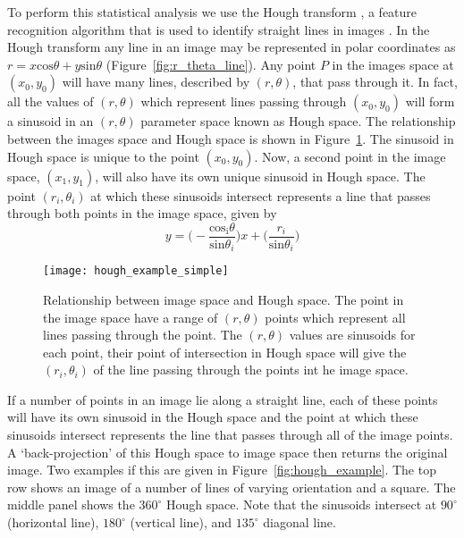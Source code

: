 To perform this statistical analysis we use the Hough transform \citep{hough1961}, a feature recognition algorithm that is used to identify straight lines in images \citep{duda1972}. In the Hough transform any line in an image may be represented in polar coordinates as $r=x\mathrm{cos}\theta +y\mathrm{sin}\theta$ (Figure~\ref{fig:r_theta_line}). Any point $P$ in the images space at $(x_0, y_0)$ will have many lines, described by $(r,\theta)$, that pass through it. In fact, all the values of $(r, \theta)$ which represent lines passing through $(x_0, y_0)$ will form a sinusoid in an $(r,\theta)$ parameter space known as Hough space. The relationship between the images space and Hough space is shown in Figure~\ref{fig:image_hough}. The sinusoid in Hough space is unique to the point $(x_0, y_0)$. Now, a second point in the image space, $(x_1, y_1)$, will also have its own unique sinusoid in Hough space. The point $(r_i,\theta_i)$ at which these sinusoids intersect represents a line that passes through both points in the image space, given by
\begin{equation}
y = \bigg(- \frac{\mathrm{cos_i}\theta}{\mathrm{sin}\theta_i}\bigg)x + \bigg(\frac{r_i}{\mathrm{sin}\theta_i}\bigg)
\end{equation}
\begin{figure}[t!]
\begin{center}
\texttt{[image: hough\_example\_simple]}
\caption[Relationship between image space and Hough space]{Relationship between image space and Hough space. The point in the image space have a range of $(r, \theta)$ points which represent all lines passing through the point. The $(r,\theta)$ values are sinusoids for each point, their point of intersection in Hough space will give the $(r_i, \theta_i)$ of the line passing through the points int he image space.}
\label{fig:image_hough}
\end{center}
\end{figure}
If a number of points in an image lie along a straight line, each of these points will have its own sinusoid in the Hough space and the point at which these sinusoids intersect represents the line that passes through all of the image points. A `back-projection' of this Hough space to image space then returns the original image. Two examples if this are given in Figure~\ref{fig:hough_example}. The top row shows an image of a number of lines of varying orientation and a square. The middle panel shows the $360^{\circ}$ Hough space. Note that the sinusoids intersect at $90^{\circ}$ (horizontal line), $180^{\circ}$ (vertical line), and $135^{\circ}$ diagonal line. 

